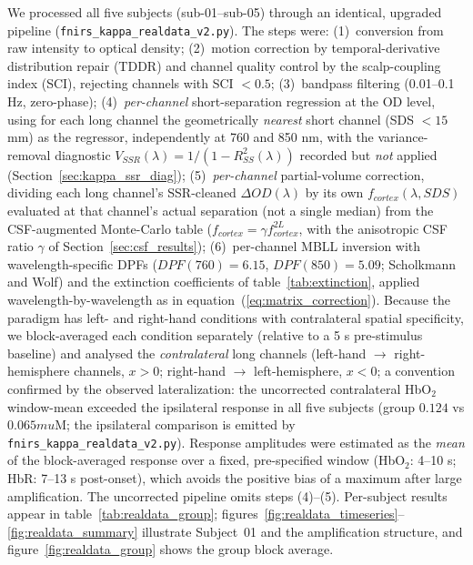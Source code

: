 \documentclass[11pt]{article}
\def\mu{mu}%
\def\mathrm#1{#1}%
\def\,{ }%
\begin{document}
We processed all five subjects (sub-01--sub-05) through an identical, upgraded pipeline (\texttt{fnirs\_kappa\_realdata\_v2.py}). The steps were: (1)~conversion from raw intensity to optical density; (2)~motion correction by temporal-derivative distribution repair (TDDR) and channel quality control by the scalp-coupling index (SCI), rejecting channels with SCI $<0.5$; (3)~bandpass filtering (0.01--0.1\,Hz, zero-phase); (4)~\emph{per-channel} short-separation regression at the OD level, using for each long channel the geometrically \emph{nearest} short channel (SDS $<15$\,mm) as the regressor, independently at 760 and 850\,nm, with the variance-removal diagnostic $V_{\mathrm{SSR}}(\lambda) = 1/(1-R^2_{\mathrm{SS}}(\lambda))$ recorded but \emph{not} applied (Section~\ref{sec:kappa_ssr_diag}); (5)~\emph{per-channel} partial-volume correction, dividing each long channel's SSR-cleaned $\Delta\mathrm{OD}(\lambda)$ by its own $f_{\mathrm{cortex}}(\lambda,\mathrm{SDS})$ evaluated at that channel's actual separation (not a single median) from the CSF-augmented Monte-Carlo table ($f_{\mathrm{cortex}} = \gamma\,f_{\mathrm{cortex}}^{\mathrm{2L}}$, with the anisotropic CSF ratio $\gamma$ of Section~\ref{sec:csf_results}); (6)~per-channel MBLL inversion with wavelength-specific DPFs ($\mathrm{DPF}(760) = 6.15$, $\mathrm{DPF}(850) = 5.09$; Scholkmann and Wolf\cite{r14}) and the extinction coefficients of table~\ref{tab:extinction}, applied wavelength-by-wavelength as in equation~(\ref{eq:matrix_correction}). Because the paradigm has left- and right-hand conditions with contralateral spatial specificity, we block-averaged each condition separately (relative to a 5\,s pre-stimulus baseline) and analysed the \emph{contralateral} long channels (left-hand $\to$ right-hemisphere channels, $x>0$; right-hand $\to$ left-hemisphere, $x<0$; a convention confirmed by the observed lateralization: the uncorrected contralateral HbO$_2$ window-mean exceeded the ipsilateral response in all five subjects (group $0.124$ vs $0.065\,\mu$M; the ipsilateral comparison is emitted by \texttt{fnirs\_kappa\_realdata\_v2.py}). Response amplitudes were estimated as the \emph{mean} of the block-averaged response over a fixed, pre-specified window (HbO$_2$: 4--10\,s; HbR: 7--13\,s post-onset), which avoids the positive bias of a maximum after large amplification. The uncorrected pipeline omits steps (4)--(5). Per-subject results appear in table~\ref{tab:realdata_group}; figures~\ref{fig:realdata_timeseries}--\ref{fig:realdata_summary} illustrate Subject~01 and the amplification structure, and figure~\ref{fig:realdata_group} shows the group block average.
\end{document}
